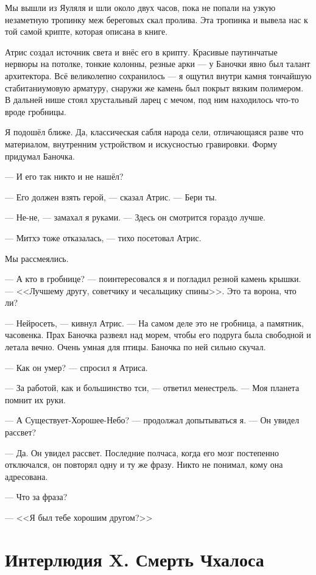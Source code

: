 Мы вышли из Яуляля и шли около двух часов, пока не попали на узкую незаметную тропинку меж береговых скал пролива.
Эта тропинка и вывела нас к той самой крипте, которая описана в книге.

Атрис создал источник света и внёс его в крипту.
Красивые паутинчатые нервюры на потолке, тонкие колонны, резные арки --- у Баночки явно был талант архитектора.
Всё великолепно сохранилось --- я ощутил внутри камня тончайшую стабитаниумовую арматуру, снаружи же камень был покрыт вязким полимером.
В дальней нише стоял хрустальный ларец с мечом, под ним находилось что-то вроде гробницы.

Я подошёл ближе.
Да, классическая сабля народа сели, отличающаяся разве что материалом, внутренним устройством и искусностью гравировки.
Форму придумал Баночка.

--- И его так никто и не нашёл?

--- Его должен взять герой, --- сказал Атрис.
--- Бери ты.

--- Не-не, --- замахал я руками.
--- Здесь он смотрится гораздо лучше.

--- Митхэ тоже отказалась, --- тихо посетовал Атрис.

Мы рассмеялись.

--- А кто в гробнице? --- поинтересовался я и погладил резной камень крышки.
--- <<Лучшему другу, советчику и чесальщику спины>>.
Это та ворона, что ли?

--- Нейросеть, --- кивнул Атрис.
--- На самом деле это не гробница, а памятник, часовенка.
Прах Баночка развеял над морем, чтобы его подруга была свободной и летала вечно.
Очень умная для птицы.
Баночка по ней сильно скучал.

--- Как он умер? --- спросил я Атриса.

--- За работой, как и большинство тси, --- ответил менестрель.
--- Моя планета помнит их руки.

--- А Существует-Хорошее-Небо? --- продолжал допытываться я.
--- Он увидел рассвет?

--- Да.
Он увидел рассвет.
Последние полчаса, когда его мозг постепенно отключался, он повторял одну и ту же фразу.
Никто не понимал, кому она адресована.

--- Что за фраза?

--- <<Я был тебе хорошим другом?>>

\chapter*{Интерлюдия X. Смерть Чхалоса}

